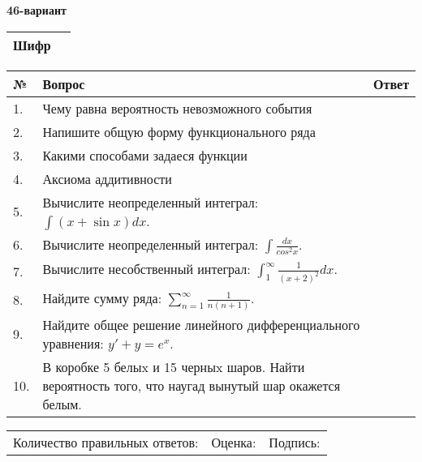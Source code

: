 \documentclass{article}
\begin{document}
  \egroup
  
  \newpage
  
  
  \textbf{46-вариант}\\
  
  \bgroup
  \def\arraystretch{1.6} %
  
  \begin{tabular}{|m{5.7cm}|m{9.5cm}|}
  \hline
  Шифр & \\
  \hline
  \end{tabular}
  
  \vspace{1cm}
  
  \begin{tabular}{|m{0.7cm}|m{10cm}|m{4cm}|}
  \hline
  № & Вопрос & Ответ \\
  \hline
  1. & Чему равна вероятность невозможного события &  \\
  \hline
  2. & Напишите общую форму функционального ряда &  \\
  \hline
  3. & Какими способами задаеся функции &  \\
  \hline
  4. & Аксиома аддитивности &  \\
  \hline
  5. & Вычислите неопределенный интеграл: \(\int{(x + \sin x)}dx\). &  \\
  \hline
  6. & Вычислите неопределенный интеграл: \(\int\frac{dx}{cos^{2}x}\). &  \\
  \hline
  7. & Вычислите несобственный интеграл: \(\int_{1}^{\infty}{\frac{1}{(x + 2)^{2}}dx}\). &  \\
  \hline
  8. & Найдите сумму ряда: \(\sum_{n = 1}^{\infty}\frac{1}{n(n + 1)}\). &  \\
  \hline
  9. & Найдите общее решение линейного дифференциального уравнения: \(y' + y = e^{x}\). &  \\
  \hline
  10. & В коробке 5 белыx и 15 черныx шаров. Найти вероятность того, что наугад вынутый шар окажется белым. &  \\
  \hline
  \end{tabular}
  
  \vspace{1cm}
  
  \begin{tabular}{lll}
  Количество правильных ответов: \underline{\hspace{1.5cm}} & 
  Оценка: \underline{\hspace{1.5cm}} & 
  Подпись: \underline{\hspace{2cm}} \\
  \end{tabular}
  
\end{document}
